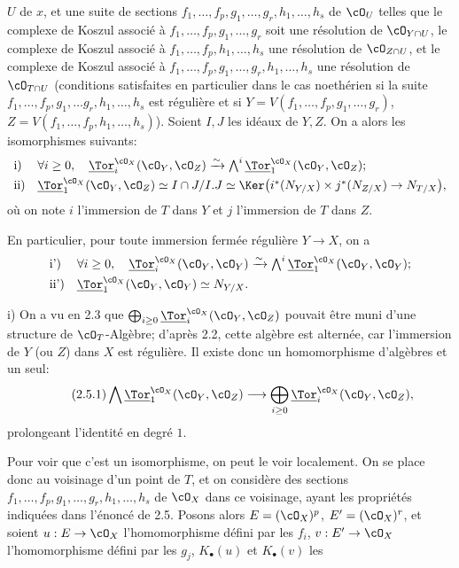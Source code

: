 \(U\) de \(x\), et une suite de sections \(f_1,\ldots,f_p,g_1,\ldots,g_r,h_1,\ldots,h_s\) de \(\cO_U\) telles que le complexe de Koszul associé à \(f_1,\ldots,f_p,g_1,\ldots,g_r\) soit une résolution de \(\cO_{Y\cap U}\), le complexe de Koszul associé à \(f_1,\ldots,f_p,h_1,\ldots,h_s\) une résolution de \(\cO_{Z\cap U}\), et le complexe de Koszul associé à \(f_1,\ldots,f_p,g_1,\ldots,g_r,h_1,\ldots,h_s\) une résolution de \(\cO_{T\cap U}\) (conditions satisfaites en particulier dans le cas noethérien si la suite \(f_1,\ldots,f_p,g_1,\ldots g_r,h_1,\ldots,h_s\) est régulière et si \(Y=V(f_1,\ldots,f_p,g_1,\ldots,g_r)\), \(Z=V(f_1,\ldots,f_p,h_1,\ldots,h_s)\)). Soient \(I,J\) les idéaux de \(Y,Z\). On a alors les isomorphismes suivants:
\[
\begin{array}{ll}
\text{i)}& \forall i\ge0,\quad
\underline{\Tor}_i^{\cO_X}(\cO_Y,\cO_Z)\xrightarrow{\sim}
\bigwedge^i\underline{\Tor}_1^{\cO_X}(\cO_Y,\cO_Z);\\[0.8ex]
\text{ii)}&
\underline{\Tor}_1^{\cO_X}(\cO_Y,\cO_Z)\simeq
I\cap J/I.J\simeq
\Ker\bigl(i^*(N_{Y/X})\times j^*(N_{Z/X})\to N_{T/X}\bigr),
\end{array}
\]
où on note \(i\) l'immersion de \(T\) dans \(Y\) et \(j\) l'immersion de \(T\) dans \(Z\).

En particulier, pour toute immersion fermée régulière \(Y\to X\), on a
\[
\begin{array}{ll}
\text{i')}& \forall i\ge0,\quad
\underline{\Tor}_i^{\cO_X}(\cO_Y,\cO_Y)\xrightarrow{\sim}
\bigwedge^i\underline{\Tor}_1^{\cO_X}(\cO_Y,\cO_Y);\\[0.8ex]
\text{ii')}&
\underline{\Tor}_1^{\cO_X}(\cO_Y,\cO_Y)\simeq N_{Y/X}.
\end{array}
\]

i) On a vu en 2.3 que \(\bigoplus_{i\ge0}\underline{\Tor}_i^{\cO_X}(\cO_Y,\cO_Z)\) pouvait être muni d'une structure de \(\cO_T\)-Algèbre; d'après 2.2, cette algèbre est alternée, car l'immersion de \(Y\) (ou \(Z\)) dans \(X\) est régulière. Il existe donc un homomorphisme d'algèbres et un seul:
\begin{equation}\tag{2.5.1}
\bigwedge \underline{\Tor}_1^{\cO_X}(\cO_Y,\cO_Z)\longrightarrow
\bigoplus_{i\ge0}\underline{\Tor}_i^{\cO_X}(\cO_Y,\cO_Z),
\end{equation}
prolongeant l'identité en degré \(1\).

Pour voir que c'est un isomorphisme, on peut le voir localement. On se place donc au voisinage d'un point de \(T\), et on considère des sections \(f_1,\ldots,f_p,g_1,\ldots,g_r,h_1,\ldots,h_s\) de \(\cO_X\) dans ce voisinage, ayant les propriétés indiquées dans l'énoncé de 2.5. Posons alors \(E=(\cO_X)^p\), \(E'=(\cO_X)^r\), et soient \(u:E\to\cO_X\) l'homomorphisme défini par les \(f_i\), \(v:E'\to\cO_X\) l'homomorphisme défini par les \(g_j\), \(K_\bullet(u)\) et \(K_\bullet(v)\) les
